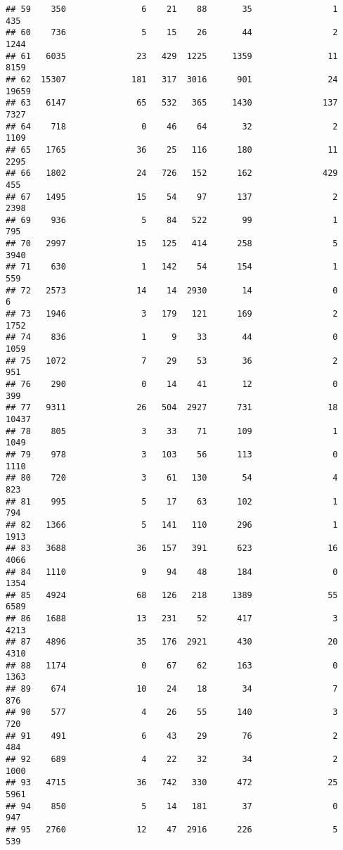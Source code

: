 \documentclass[
]{article}
\begin{document}
\begin{verbatim}
## 59    350               6    21    88       35                1   435
## 60    736               5    15    26       44                2  1244
## 61   6035              23   429  1225     1359               11  8159
## 62  15307             181   317  3016      901               24 19659
## 63   6147              65   532   365     1430              137  7327
## 64    718               0    46    64       32                2  1109
## 65   1765              36    25   116      180               11  2295
## 66   1802              24   726   152      162              429   455
## 67   1495              15    54    97      137                2  2398
## 69    936               5    84   522       99                1   795
## 70   2997              15   125   414      258                5  3940
## 71    630               1   142    54      154                1   559
## 72   2573              14    14  2930       14                0     6
## 73   1946               3   179   121      169                2  1752
## 74    836               1     9    33       44                0  1059
## 75   1072               7    29    53       36                2   951
## 76    290               0    14    41       12                0   399
## 77   9311              26   504  2927      731               18 10437
## 78    805               3    33    71      109                1  1049
## 79    978               3   103    56      113                0  1110
## 80    720               3    61   130       54                4   823
## 81    995               5    17    63      102                1   794
## 82   1366               5   141   110      296                1  1913
## 83   3688              36   157   391      623               16  4066
## 84   1110               9    94    48      184                0  1354
## 85   4924              68   126   218     1389               55  6589
## 86   1688              13   231    52      417                3  4213
## 87   4896              35   176  2921      430               20  4310
## 88   1174               0    67    62      163                0  1363
## 89    674              10    24    18       34                7   876
## 90    577               4    26    55      140                3   720
## 91    491               6    43    29       76                2   484
## 92    689               4    22    32       34                2  1000
## 93   4715              36   742   330      472               25  5961
## 94    850               5    14   181       37                0   947
## 95   2760              12    47  2916      226                5   539

\end{verbatim}
\end{document}
